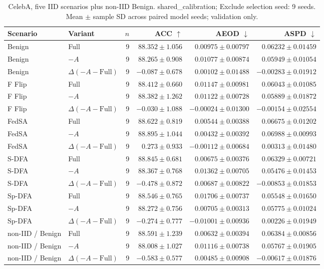 \begin{table}[t]
\centering
\small
\caption{CelebA, five IID scenarios plus non-IID Benign. shared\_calibration; Exclude selection seed: 9 seeds. Mean $\pm$ sample SD across paired model seeds; validation only.}
\begin{tabular}{llrrrr}
\toprule
Scenario & Variant & $n$ & ACC $\uparrow$ & AEOD $\downarrow$ & ASPD $\downarrow$ \\
\midrule
Benign & Full & 9 & $88.352 \pm 1.056$ & $0.00975 \pm 0.00797$ & $0.06232 \pm 0.01459$ \\
Benign & $-A$ & 9 & $88.265 \pm 0.908$ & $0.01077 \pm 0.00874$ & $0.05949 \pm 0.01054$ \\
Benign & $\Delta(-A-\mathrm{Full})$ & 9 & $-0.087 \pm 0.678$ & $0.00102 \pm 0.01488$ & $-0.00283 \pm 0.01912$ \\
F Flip & Full & 9 & $88.412 \pm 0.660$ & $0.01147 \pm 0.00981$ & $0.06043 \pm 0.01085$ \\
F Flip & $-A$ & 9 & $88.382 \pm 1.262$ & $0.01122 \pm 0.00728$ & $0.05889 \pm 0.01872$ \\
F Flip & $\Delta(-A-\mathrm{Full})$ & 9 & $-0.030 \pm 1.088$ & $-0.00024 \pm 0.01300$ & $-0.00154 \pm 0.02554$ \\
FedSA & Full & 9 & $88.622 \pm 0.819$ & $0.00544 \pm 0.00388$ & $0.06675 \pm 0.01202$ \\
FedSA & $-A$ & 9 & $88.895 \pm 1.044$ & $0.00432 \pm 0.00392$ & $0.06988 \pm 0.00993$ \\
FedSA & $\Delta(-A-\mathrm{Full})$ & 9 & $0.273 \pm 0.933$ & $-0.00112 \pm 0.00684$ & $0.00313 \pm 0.01480$ \\
S-DFA & Full & 9 & $88.845 \pm 0.681$ & $0.00675 \pm 0.00376$ & $0.06329 \pm 0.00721$ \\
S-DFA & $-A$ & 9 & $88.367 \pm 0.768$ & $0.01362 \pm 0.00705$ & $0.05476 \pm 0.01453$ \\
S-DFA & $\Delta(-A-\mathrm{Full})$ & 9 & $-0.478 \pm 0.872$ & $0.00687 \pm 0.00822$ & $-0.00853 \pm 0.01853$ \\
Sp-DFA & Full & 9 & $88.546 \pm 0.765$ & $0.01706 \pm 0.00737$ & $0.05548 \pm 0.01650$ \\
Sp-DFA & $-A$ & 9 & $88.272 \pm 0.756$ & $0.00705 \pm 0.00313$ & $0.05775 \pm 0.01024$ \\
Sp-DFA & $\Delta(-A-\mathrm{Full})$ & 9 & $-0.274 \pm 0.777$ & $-0.01001 \pm 0.00936$ & $0.00226 \pm 0.01949$ \\
non-IID / Benign & Full & 9 & $88.591 \pm 1.239$ & $0.00632 \pm 0.00394$ & $0.06384 \pm 0.00856$ \\
non-IID / Benign & $-A$ & 9 & $88.008 \pm 1.027$ & $0.01116 \pm 0.00738$ & $0.05767 \pm 0.01905$ \\
non-IID / Benign & $\Delta(-A-\mathrm{Full})$ & 9 & $-0.583 \pm 0.577$ & $0.00485 \pm 0.00908$ & $-0.00617 \pm 0.01876$ \\
\bottomrule
\end{tabular}
\end{table}

